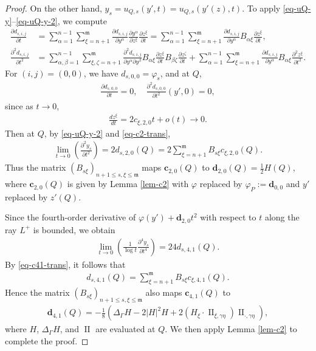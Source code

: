 \documentclass[10pt,a4paper]{amsart}
\newcommand{\fm}{\mathfrak{m}}
\renewcommand{\leq}{\leqslant}
\begin{document}
\begin{proof}
On the other hand, $y_s = u_{Q, s}(y', t) = u_{Q, s}(y'(z), t)$. To apply \eqref{eq-uQ-y}--\eqref{eq-uQ-y-2}, we compute
\begin{align}
    \frac{\partial d_{s, i,j}}{\partial t} &= \sum_{\alpha=1}^{n-1}\sum_{\xi =n+1}^\fm \frac{\partial d_{s, i,j}}{\partial y^\alpha} \frac{\partial y^\alpha}{\partial z^\xi} \frac{\partial z^\xi}{\partial t} = \sum_{\alpha=1}^{n-1}\sum_{\xi =n+1}^\fm \frac{\partial d_{s, i,j}}{\partial y^\alpha} B_{\alpha\xi} \frac{\partial z^\xi}{\partial t}, \\
    \frac{\partial^2 d_{s, i,j}}{\partial t^2} &= \sum_{\alpha,\beta=1}^{n-1}\sum_{\xi,\zeta =n+1}^\fm \frac{\partial^2 d_{s, i,j}}{\partial y^\alpha \partial y^\beta} B_{\alpha\xi} \frac{\partial z^\xi}{\partial t} B_{\beta\zeta} \frac{\partial z^\zeta}{\partial t}+\sum_{\alpha=1}^{n-1}\sum_{\xi =n+1}^\fm \frac{\partial d_{s, i,j}}{\partial y^\alpha} B_{\alpha\xi} \frac{\partial^2 z^\xi}{\partial t^2}.
\end{align}
For $(i,j)=(0,0)$, we have $d_{s,0,0}=\varphi_s$, and at $Q$,
\begin{align}
    \frac{\partial d_{s, 0,0}}{\partial t}=0, \quad \frac{\partial^2 d_{s, 0,0}}{\partial t^2} (y', 0)=0,
\end{align}
since as $t\rightarrow 0$,
\begin{align}
    \frac{d z^\xi}{d t} = 2c_{\xi, 2, 0} t+o(t) \rightarrow 0.
\end{align}
Then at $Q$, by \eqref{eq-uQ-y-2} and \eqref{eq-c2-trans},
\begin{align}
   \lim_{t\rightarrow 0}\left(\frac{\partial^2 y_s}{\partial t^2} \right) = 2 d_{s, 2, 0}(Q)=2 \sum_{\xi=n+1}^\fm B_{s\xi} c_{\xi,2,0}(Q).
\end{align}
Thus the matrix $(B_{s\xi})_{n+1\leq s, \xi\leq \fm}$ maps $\mathbf c_{2,0}(Q)$ to $\mathbf d_{2,0}(Q) = \frac{1}{2}H(Q)$, where $\mathbf c_{2,0}(Q)$ is given by Lemma \ref{lem-c2} with $\varphi$ replaced by $\varphi_P := \mathbf d_{0,0}$ and $y'$ replaced by $z'(Q)$.

Since the fourth-order derivative of $\varphi(y')+ \mathbf d_{2, 0} t^2$ with respect to $t$ along the ray $L^+$ is bounded, we obtain
\begin{align}
    \lim_{t\rightarrow 0}\left(\frac{1}{\log t} \frac{\partial^4 y_s}{\partial t^4} \right) = 24 d_{s,4,1}(Q).
\end{align}
By \eqref{eq-c41-trans}, it follows that
\begin{align}
    d_{s,4,1}(Q) = \sum_{\xi=n+1}^\fm B_{s\xi} c_{\xi,4,1}(Q).
\end{align}
Hence the matrix $(B_{s\xi})_{n+1\leq s, \xi\leq \fm}$ also maps $\mathbf c_{4,1}(Q)$ to
\begin{align}
\mathbf d_{4,1}(Q) =  -\frac{1}{8} \left( \Delta_\Gamma H-2|H|^2 H + 2(H_{\xi} \cdot \operatorname{II}_{\xi,\gamma\eta}) \operatorname{II}_{\cdot,\gamma\eta}\right),
\end{align}
where $H$, $\Delta_\Gamma H$, and $\operatorname{II}$ are evaluated at $Q$. We then apply Lemma \ref{lem-c2}  to complete the proof.
\end{proof}
\end{document}
